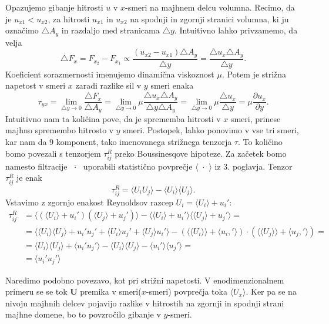 \documentclass[mat2, tisk]{fmfdelo}
\newcommand{\bd}{\textbf}
\begin{document}
Opazujemo gibanje hitrosti $u$ v $x$-smeri na majhnem delcu volumna. Recimo, da je $u_{x1} < u_{x2}$, 
za hitrosti $u_{x1}$ in $u_{x2}$ na spodnji in zgornji stranici volumna, ki ju označimo $\triangle A_y$
in razdaljo med stranicama $\triangle y$. Intuitivno lahko privzamemo, da velja 
$$
\triangle F_x = F_{x_2} - F_{x_1} \propto \frac{(u_{x2} - u_{x1})\triangle A_y}{\triangle y} = \frac{\triangle u_x\triangle A_y}{\triangle y}.
$$
Koeficient sorazmernosti imenujemo dinamična viskoznost $\mu$. Potem je strižna napetost 
v smeri $x$ zaradi razlike sil v $y$ smeri enaka
$$
\tau_{yx} = \lim_{\triangle y \rightarrow 0} \frac{\triangle F_x}{\triangle A_y} = 
\lim_{\triangle y \rightarrow 0} \mu \frac{\triangle u_x \triangle A_y}{\triangle y\triangle A_y} = 
\lim_{\triangle y \rightarrow 0} \mu \frac{\triangle u_x}{\triangle y} = \mu \frac{\partial u_x}{\partial y}.
$$
Intuitivno nam ta količina pove, da je sprememba hitrosti v $x$ smeri, prinese majhno spremembo hitrosto v $y$
smeri. Postopek, lahko ponovimo v vse tri smeri, kar nam da $9$ komponent, tako imenovanega 
strižnega tenzorja $\tau$. To količino bomo povezali s tenzorjem $\tau_{ij}^R$ preko 
Boussinesqove hipoteze. Za začetek bomo namesto filtracije $\overline{\,\,\cdot\,\,}$ uporabili 
statistično povprečje $\langle\,\, \cdot \,\,\rangle$ iz 3. poglavja. Tenzor $\tau_{ij}^R$ je 
enak 
$$
\tau_{ij}^R = \langle U_i U_j \rangle - \langle U_i \rangle \langle U_j \rangle.
$$
Vstavimo z zgornjo enakost Reynoldsov razcep $U_i = \langle U_i \rangle + u_i'$: 
\begin{align*}
\tau_{ij}^R &= \langle (\langle U_i \rangle + u_i')(\langle U_j \rangle + u_j') \rangle - \langle \langle U_i \rangle + u_i' \rangle \langle \langle U_j \rangle + u_j' \rangle = \\
&= \langle \langle U_i \rangle \langle U_j \rangle + u_i' u_j' + \langle U_i \rangle u_j' + \langle U_j \rangle u_i' \rangle - (\langle\langle U_i \rangle\rangle +\langle u_i,'\rangle) \cdot (\langle\langle U_j \rangle\rangle + \langle u_j,'\rangle) = \\[2mm]
&= \langle U_i\rangle \langle U_j \rangle + \langle u_i' u_j' \rangle - \langle U_i \rangle \langle U_j \rangle - \langle u_i' \rangle \langle u_j' \rangle = \\
&= \langle u_i' u_j' \rangle
\end{align*}

Naredimo podobno povezavo, kot pri strižni napetosti. V enodimenzionalnem primeru se 
se tok $\bd{U}$ premika v smeri($x$-smeri) povprečja toka $\langle U_x \rangle$. Ker pa se na 
nivoju majhnih delcev pojavijo razlike v hitrostih na zgornji in spodnji strani majhne domene, 
bo to povzročilo gibanje v $y$-smeri. 
\end{document}
